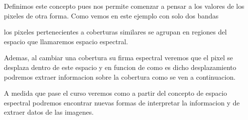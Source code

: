 Definimos este concepto pues nos permite comenzar a pensar a los valores de los
pixeles de otra forma. Como vemos en este ejemplo con solo dos bandas

los pixeles pertenecientes a coberturas similares se agrupan en regiones del
espacio que llamaremos espacio espectral.

Ademas, al cambiar una cobertura su firma espectral veremos que el pixel se
desplaza dentro de este espacio y en funcion de como es dicho desplazamiento
podremos extraer informacion sobre la cobertura como se ven a continuacion.

A medida que pase el curso veremos como a partir del concepto de espacio
espectral podremos encontrar nuevas formas de interpretar la informacion y de
extraer datos de las imagenes.
